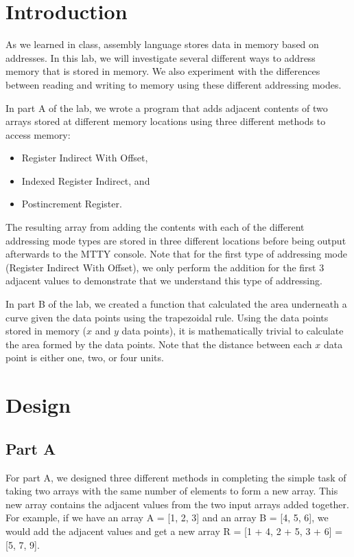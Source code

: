 \documentclass[10pt, letterpaper, titlepage]{article} %
\title{\textbf{\Huge{
\begin{center}
Introduction to\\ Addressing Modes\\
\end{center}
}}}
\author{Benjamin Kong | 1573684\\Lora Ma ||||| 1570935\\ \\ECE 212 Lab Section H11}
\begin{document}
 
\maketitle 
\thispagestyle{empty}
\tableofcontents 
\newpage
{}

\begin{multicols*}{2}


\section{Introduction}
As we learned in class, assembly language stores data in memory based on addresses. 
In this lab, we will investigate several different ways to address memory that is stored in memory. 
We also experiment with the differences between reading and writing to memory using these different addressing modes.

In part A of the lab, we wrote a program that adds adjacent contents of two arrays stored at different memory locations using three different methods to access memory:
\begin{itemize}
	\item Register Indirect With Offset,
	\item Indexed Register Indirect, and
	\item Postincrement Register.
\end{itemize}
The resulting array from adding the contents with each of the different addressing mode types are stored in three different locations before being output afterwards to the MTTY console. 
Note that for the first type of addressing mode (Register Indirect With Offset), we only perform the addition for the first 3 adjacent values to demonstrate that we understand this type of addressing.

In part B of the lab, we created a function that calculated the area underneath a curve given the data points using the trapezoidal rule. 
Using the data points stored in memory ($x$ and $y$ data points), it is mathematically trivial to calculate the area formed by the data points. 
Note that the distance between each $x$ data point is either one, two, or four units. 

\section{Design}
\subsection{Part A}
For part A, we designed three different methods in completing the simple task of taking two arrays with the same number of elements to form a new array.
This new array contains the adjacent values from the two input arrays added together.
For example, if we have an array A = [1, 2, 3] and an array B = [4, 5, 6], we would add the adjacent values and get a new array R = [1 + 4, 2 + 5, 3 + 6] = [5, 7, 9].


\end{multicols*}
\end{document}

